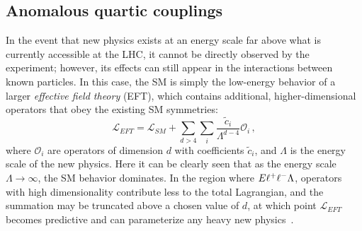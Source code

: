 \subsection{Anomalous quartic couplings}\label{ssww13tef:aqgc}
In the event that new physics exists at an energy scale far above what is currently accessible at the LHC, it cannot be directly observed by the experiment; however, its effects can still appear in the interactions between known particles.
In this case, the SM is simply the low-energy behavior of a larger \emph{effective field theory} (EFT), which contains additional, higher-dimensional operators that obey the existing SM symmetries:
\begin{equation}
  \mathcal{L}_{EFT} = \mathcal{L}_{SM}+\sum\limits_{d > 4}\sum\limits_i \frac{\tilde{c}_{i}}{\Lambda^{d-4}}\mathcal{O}_{i}\,,
  \label{eq:eft_lagrangian}
\end{equation}
where $\mathcal{O}_i$ are operators of dimension $d$ with coefficients $\tilde{c}_i$, and $\Lambda$ is the energy scale of the new physics.
Here it can be clearly seen that as the energy scale $\Lambda\rightarrow\infty$, the SM behavior dominates.
In the region where $E\muchless\Lambda$, operators with high dimensionality contribute less to the total Lagrangian, and the summation may be truncated above a chosen value of $d$, at which point $\mathcal{L}_{EFT}$ becomes predictive and can parameterize any heavy new physics~\cite{2013.aqgc-mc}.


